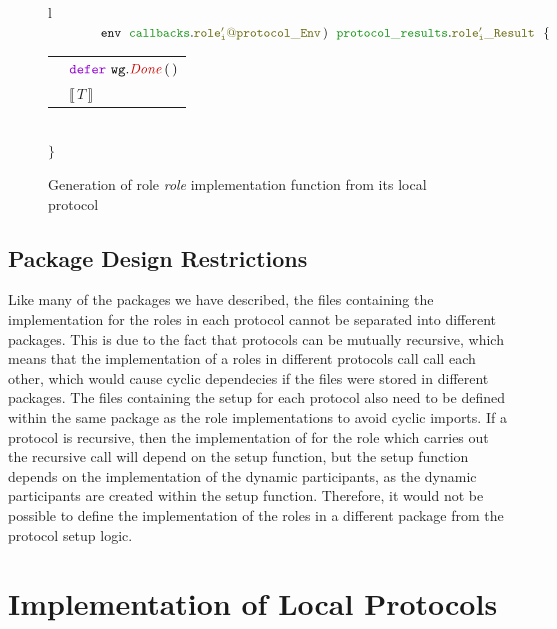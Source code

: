 \documentclass[12pt,twoside]{report}
\begin{document}
\begin{figure}[!h]
\begin{center}
\begin{tabular}{l}
            $\qquad \qquad \envparam\;\ \envtype{role'_i}{protocol}\,)\ \ \resulttype{role'_i}{protocol}\ \ \{$\\[6pt]
            
            \begin{tabular}{ll}
                \indent & $\godefer\ \methodcall{wg}{Done}\,(\,)$\\[3.5pt]
                \indent & $\llbracket \, T \, \rrbracket$
            \end{tabular}\\[6pt]

            $\}$\\

        \end{tabular}
    \end{center}
    \caption{Generation of role \textit{role} implementation function from its local protocol}
    \label{role-func-sig-gen}
\end{figure}

\subsection{Package Design Restrictions}

Like many of the packages we have described, the files containing the implementation for the roles in each protocol cannot be separated into different packages. This is due to the fact that protocols can be mutually recursive, which means that the implementation of a roles in different protocols call call each other, which would cause cyclic dependecies if the files were stored in different packages. The files containing the setup for each protocol also need to be defined within the same package as the role implementations to avoid cyclic imports. If a protocol is recursive, then the implementation of for the role which carries out the recursive call will depend on the setup function, but the setup function depends on the implementation of the dynamic participants, as the dynamic participants are created within the setup function. Therefore, it would not be possible to define the implementation of the roles in a different package from the protocol setup logic.\\


\section{Implementation of Local Protocols}\label{local-protocol-codegen}
\end{document}

